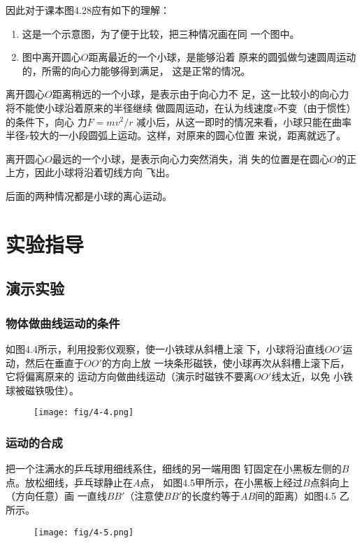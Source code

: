 因此对于课本图4.28应有如下的理解：
\begin{enumerate}
    \item 这是一个示意图，为了便于比较，把三种情况画在同
一个图中。
\item 图中离开圆心$O$距离最近的一个小球，是能够沿着
原来的圆弧做匀速圆周运动的，所需的向心力能够得到满足，
这是正常的情况。
\end{enumerate}

离开圆心$O$距离稍远的一个小球，是表示由于向心力不
足，这一比较小的向心力将不能使小球沿着原来的半径继续
做圆周运动，在认为线速度$v$不变（由于惯性）的条件下，向心
力$F=mv^2/r$
减小后，从这一即时的情况来看，小球只能在曲率
半径$r$较大的一小段圆弧上运动。这样，对原来的圆心位置
来说，距离就远了。

离开圆心$O$最远的一个小球，是表示向心力突然消失，消
失的位置是在圆心$O$的正上方，因此小球将沿着切线方向
飞出。

后面的两种情况都是小球的离心运动。


\section{实验指导}
\subsection{演示实验}
\subsubsection{物体做曲线运动的条件}

如图4.4所示，利用投影仪观察，使一小铁球从斜槽上滚
下，小球将沿直线$OO'$运动，然后在垂直于$OO'$的方向上放
一块条形磁铁，使小球再次从斜槽上滚下后，它将偏离原来的
运动方向做曲线运动（演示时磁铁不要离$OO'$线太近，以免
小铁球被磁铁吸住）。


\begin{figure}[htp]
    \centering
    \texttt{[image: fig/4-4.png]}
    \caption{}
\end{figure}

\subsubsection{运动的合成}
把一个注满水的乒乓球用细线系住，细线的另一端用图
钉固定在小黑板左侧的$B$点。放松细线，乒乓球静止在$A$点，
如图4.5甲所示，在小黑板上经过$B$点斜向上（方向任意）画
一直线$BB'$（注意使$BB'$的长度约等于$AB$间的距离）如图4.5
乙所示。
\begin{figure}[htp]
    \centering
    \texttt{[image: fig/4-5.png]}
    \caption{}
\end{figure}

